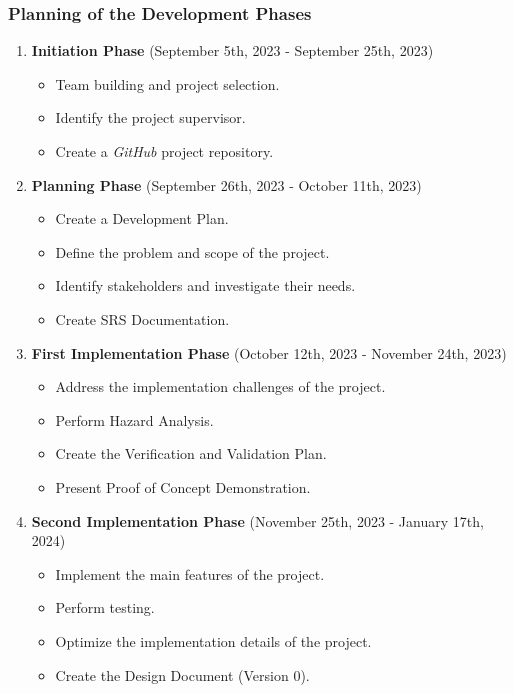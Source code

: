 \documentclass[12pt]{article}
\begin{document}
\subsubsection{Planning of the Development Phases}

    \begin{enumerate}
      \item \textbf{Initiation Phase} (September 5th, 2023 - September 25th, 2023)
      \begin{itemize}
        \item Team building and project selection.
        \item Identify the project supervisor.
        \item Create a \textit{GitHub} project repository.
      \end{itemize}
    
      \item \textbf{Planning Phase} (September 26th, 2023 - October 11th, 2023)
      \begin{itemize}
        \item Create a Development Plan.
        \item Define the problem and scope of the project.
        \item Identify stakeholders and investigate their needs.
        \item Create SRS Documentation.
      \end{itemize}
    
      \item \textbf{First Implementation Phase} (October 12th, 2023 - November 24th, 2023)
      \begin{itemize}
        \item Address the implementation challenges of the project.
        \item Perform Hazard Analysis.
        \item Create the Verification and Validation Plan.
        \item Present Proof of Concept Demonstration.
      \end{itemize}
      
      \item \textbf{Second Implementation Phase} (November 25th, 2023 - January 17th, 2024)
      \begin{itemize}
        \item Implement the main features of the project.
        \item Perform testing.
        \item Optimize the implementation details of the project.
        \item Create the Design Document (Version 0).
      \end{itemize}
    

\end{enumerate}
\end{document}
